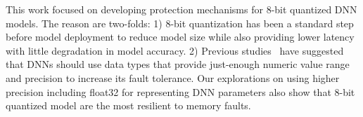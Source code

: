 \documentclass{article}
\begin{document}
This work focused on developing protection mechanisms for 8-bit quantized DNN models. The reason are two-folds: 1) 8-bit quantization has been a standard step before model deployment to reduce model size while also providing lower latency with little degradation in model accuracy. 2) Previous studies~\cite{li2017understanding, reagen2018ares} have suggested that DNNs should use data types that provide just-enough numeric value range and precision to increase its fault tolerance. Our explorations on using higher precision including float32 for representing DNN parameters  also show that 8-bit quantized model are the most resilient to memory faults. 



\end{document}
